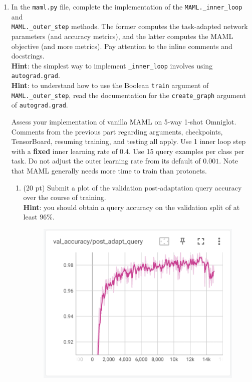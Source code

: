 \documentclass[12pt]{article}
\begin{document}
\begin{enumerate}
    \item In the \texttt{maml.py} file, complete the implementation of the \texttt{MAML.\_inner\_loop} and \\ \texttt{MAML.\_outer\_step} methods. The former computes the task-adapted network parameters (and accuracy metrics), and the latter computes the MAML objective (and more metrics). Pay attention to the inline comments and docstrings. \\
    \textbf{Hint}: the simplest way to implement \texttt{\_inner\_loop} involves using \texttt{autograd.grad}. \\
    \textbf{Hint}: to understand how to use the Boolean \texttt{train} argument of \texttt{MAML.\_outer\_step}, read the documentation for the \texttt{create\_graph} argument of \texttt{autograd.grad}.
    
    Assess your implementation of vanilla MAML on 5-way 1-shot Omniglot. Comments from the previous part regarding arguments, checkpoints, TensorBoard, resuming training, and testing all apply. Use 1 inner loop step with a \textbf{fixed} inner learning rate of 0.4. Use 15 query examples per class per task. Do not adjust the outer learning rate from its default of $0.001$. Note that MAML generally needs more time to train than protonets.
    \begin{enumerate}
        \newpage
        \item (20 pt) Submit a plot of the validation post-adaptation query accuracy over the course of training. \\
        \textbf{Hint}: you should obtain a query accuracy on the validation split of at least $96\%$.
        
\begin{figure}[H]
\centering
\includegraphics[width=\linewidth]{figures/maml_validation_query_accuracy.png}
\end{figure}
        

\end{enumerate}
\end{enumerate}
\end{document}
